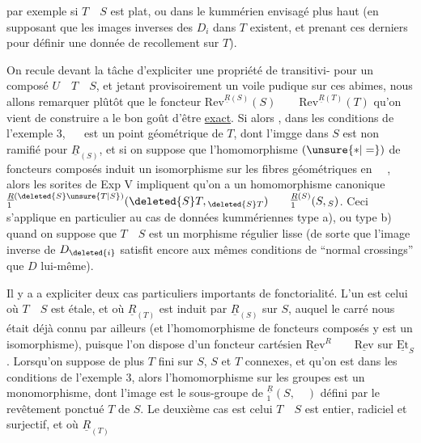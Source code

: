 par exemple si $T\quad S$ est plat, ou dans le kummérien  envisagé plus haut (en supposant que les images inverses des $D_i$ dans $T$ existent, et prenant ces derniers pour définir une donnée de recollement sur $T$).

On recule devant la tâche d'expliciter une propriété de transitivi- pour un composé $U\quad T\quad S$, et jetant provisoirement un voile pudique sur ces abimes, nous allons remarquer plûtôt que le foncteur $\mathrm{Rev}^{\underline R(S)}(S)\qquad\mathrm{Rev}^{\underline R(T)}(T)$ qu'on vient de construire a le bon goût d'être \uline{exact}. Si alors , dans les conditions de l'exemple 3, $\quad$ est un point géométrique de $T$,  dont l'imgge dans $S$ est non ramifié pour $\underline R_{(S)}$, et si on suppose que  l'homomorphisme  $(\unsure{*|=})$ de foncteurs composés induit un isomorphisme sur les fibres géométriques en $\quad$, alors les sorites de Exp V impliquent qu'on a un homomorphisme canonique $ {}_{1}^{\underline R(\deleted{S}\unsure{T|S})}(\deleted{S}T,{}_{\deleted{S}T})\qquad{}_{1}^{\underline R(S)}(S,{}_{S})$. Ceci s'applique en particulier au cas de données kummériennes type a), ou type b)  quand on suppose que $T\quad S$ est un morphisme régulier  lisse (de sorte que l'image inverse de $D_{\deleted{i}}$ satisfit encore aux mêmes conditions de ``normal crossings'' que $D$ lui-même).

Il y a a expliciter deux cas particuliers importants de fonctorialité. L'un est celui où $T\quad S$ est étale, et où $\underline R_{(T)}$ est induit par $\underline R_{(S)}$ sur $S$, auquel le  carré nous était déjà connu par ailleurs (et l'homomorphisme de foncteurs composés y est un isomorphisme), puisque l'on dispose d'un foncteur cartésien $\underline{\mathrm{Rev}}^{R}\qquad\underline{\mathrm{Rev}}$ sur $\underline{\mathrm{Et}}_S$. Lorsqu'on suppose de plus $T$ fini sur $S$, $S$ et $T$ connexes, et qu'on est dans les conditions de l'exemple 3, alors l'homomorphisme sur les groupes  est un monomorphisme, dont l'image est le sous-groupe de $ {}_{1}^{\underline R}(S,\quad)$ défini par le revêtement ponctué $T$ de $S$. Le deuxième cas est celui  $T\quad S$ est   entier, radiciel et surjectif, et où $\underline R_{(T)}$
